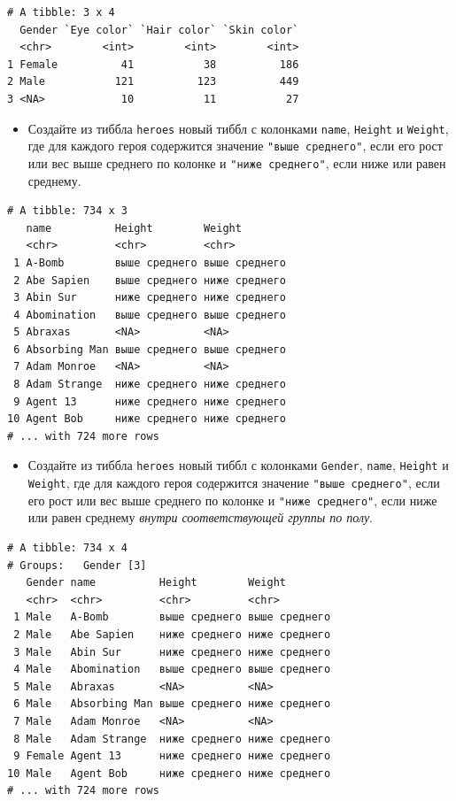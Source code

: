\documentclass[
]{book}
\providecommand{\tightlist}{%
  \setlength{\itemsep}{0pt}\setlength{\parskip}{0pt}}
\begin{document}
\begin{verbatim}
# A tibble: 3 x 4
  Gender `Eye color` `Hair color` `Skin color`
  <chr>        <int>        <int>        <int>
1 Female          41           38          186
2 Male           121          123          449
3 <NA>            10           11           27
\end{verbatim}

\begin{itemize}
\tightlist
\item
  Создайте из тиббла \texttt{heroes} новый тиббл с колонками \texttt{name}, \texttt{Height} и \texttt{Weight}, где для каждого героя содержится значение \texttt{"выше\ среднего"}, если его рост или вес выше среднего по колонке и \texttt{"ниже\ среднего"}, если ниже или равен среднему.
\end{itemize}

\begin{verbatim}
# A tibble: 734 x 3
   name          Height        Weight       
   <chr>         <chr>         <chr>        
 1 A-Bomb        выше среднего выше среднего
 2 Abe Sapien    выше среднего ниже среднего
 3 Abin Sur      ниже среднего ниже среднего
 4 Abomination   выше среднего выше среднего
 5 Abraxas       <NA>          <NA>         
 6 Absorbing Man выше среднего выше среднего
 7 Adam Monroe   <NA>          <NA>         
 8 Adam Strange  ниже среднего ниже среднего
 9 Agent 13      ниже среднего ниже среднего
10 Agent Bob     ниже среднего ниже среднего
# ... with 724 more rows
\end{verbatim}

\begin{itemize}
\tightlist
\item
  Создайте из тиббла \texttt{heroes} новый тиббл с колонками \texttt{Gender}, \texttt{name}, \texttt{Height} и \texttt{Weight}, где для каждого героя содержится значение \texttt{"выше\ среднего"}, если его рост или вес выше среднего по колонке и \texttt{"ниже\ среднего"}, если ниже или равен среднему \emph{внутри соответствующей группы по полу}.
\end{itemize}

\begin{verbatim}
# A tibble: 734 x 4
# Groups:   Gender [3]
   Gender name          Height        Weight       
   <chr>  <chr>         <chr>         <chr>        
 1 Male   A-Bomb        выше среднего выше среднего
 2 Male   Abe Sapien    ниже среднего ниже среднего
 3 Male   Abin Sur      ниже среднего ниже среднего
 4 Male   Abomination   выше среднего выше среднего
 5 Male   Abraxas       <NA>          <NA>         
 6 Male   Absorbing Man выше среднего ниже среднего
 7 Male   Adam Monroe   <NA>          <NA>         
 8 Male   Adam Strange  ниже среднего ниже среднего
 9 Female Agent 13      ниже среднего ниже среднего
10 Male   Agent Bob     ниже среднего ниже среднего
# ... with 724 more rows
\end{verbatim}
\end{document}
